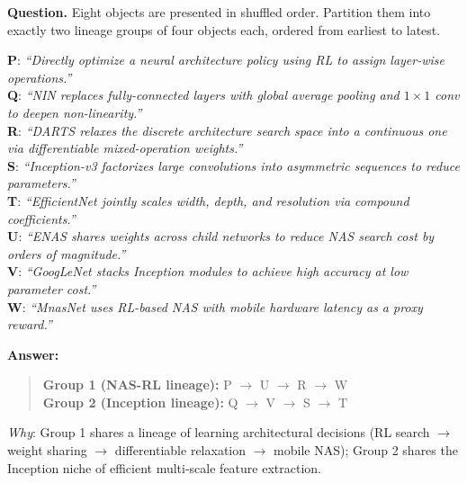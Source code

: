 \begin{tcolorbox}[
    breakable,
    title={Example of T2 · Inheritance Tracing (T2-04: Lineage Grouping)},
    colback=LighterGray,
    colframe=DeepPurple,
    colbacktitle=DeepPurple,
    coltitle=White,
]
\textbf{\textcolor{CaseOrange}{Question.}} Eight \genome{} objects are presented in shuffled order. Partition them into exactly two lineage groups of four objects each, ordered from earliest to latest.

\smallskip
\textbf{P}: \textit{``Directly optimize a neural architecture policy using RL to assign layer-wise operations.''}\\
\textbf{Q}: \textit{``NIN replaces fully-connected layers with global average pooling and $1{\times}1$ conv to deepen non-linearity.''}\\
\textbf{R}: \textit{``DARTS relaxes the discrete architecture search space into a continuous one via differentiable mixed-operation weights.''}\\
\textbf{S}: \textit{``Inception-v3 factorizes large convolutions into asymmetric sequences to reduce parameters.''}\\
\textbf{T}: \textit{``EfficientNet jointly scales width, depth, and resolution via compound coefficients.''}\\
\textbf{U}: \textit{``ENAS shares weights across child networks to reduce NAS search cost by orders of magnitude.''}\\
\textbf{V}: \textit{``GoogLeNet stacks Inception modules to achieve high accuracy at low parameter cost.''}\\
\textbf{W}: \textit{``MnasNet uses RL-based NAS with mobile hardware latency as a proxy reward.''}

\medskip
\textbf{\textcolor{CaseBlue}{Answer:}}
\begin{quote}\small
\textbf{Group 1 (NAS-RL lineage):} P $\to$ U $\to$ R $\to$ W\\
\textbf{Group 2 (Inception lineage):} Q $\to$ V $\to$ S $\to$ T
\end{quote}
\textit{Why}: Group 1 shares a lineage of learning architectural decisions (RL search $\to$ weight sharing $\to$ differentiable relaxation $\to$ mobile NAS); Group 2 shares the Inception niche of efficient multi-scale feature extraction.
\end{tcolorbox}

\bigskip


